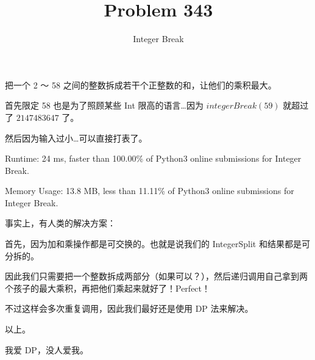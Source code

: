 \documentclass[UTF8]{ctexart}
\title{Problem 343}
\author{Integer Break}
\begin{document}
把一个 2 ～ 58 之间的整数拆成若干个正整数的和，让他们的乘积最大。

首先限定 58 也是为了照顾某些 Int 限高的语言…因为 $integerBreak(59)$ 就超过了 $2147483647$ 了。

然后因为输入过小…可以直接打表了。

Runtime: 24 ms, faster than 100.00\% of Python3 online submissions for Integer Break.

Memory Usage: 13.8 MB, less than 11.11\% of Python3 online submissions for Integer Break.

事实上，有人类的解决方案：

首先，因为加和乘操作都是可交换的。也就是说我们的 IntegerSplit 和结果都是可分拆的。

因此我们只需要把一个整数拆成两部分（如果可以？），然后递归调用自己拿到两个孩子的最大乘积，再把他们乘起来就好了！Perfect！

不过这样会多次重复调用，因此我们最好还是使用 DP 法来解决。

以上。

我爱 DP，没人爱我。
\end{document}
